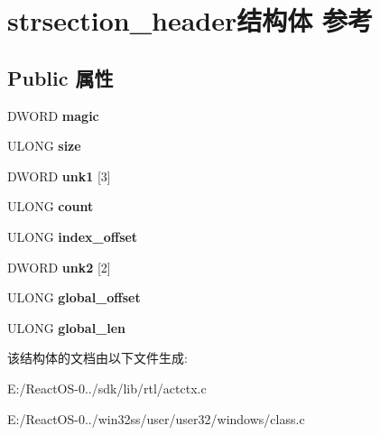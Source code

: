 \hypertarget{structstrsection__header}{}\section{strsection\+\_\+header结构体 参考}
\label{structstrsection__header}
\subsection*{Public 属性}
\begin{DoxyCompactItemize}
\item 
\mbox{\label{structstrsection__header_a0f4d5969d12c5f7605b0205c4ec34d9e}} 
D\+W\+O\+RD {\bfseries magic}
\item 
\mbox{\label{structstrsection__header_a67d764a321bee3d7b6ea0d385c965360}} 
U\+L\+O\+NG {\bfseries size}
\item 
\mbox{\label{structstrsection__header_a01d2f0e22b9e78d9903d50e5b0f43f2b}} 
D\+W\+O\+RD {\bfseries unk1} \mbox{[}3\mbox{]}
\item 
\mbox{\label{structstrsection__header_a1725d70d71948e3d7d85a242e8dd821a}} 
U\+L\+O\+NG {\bfseries count}
\item 
\mbox{\label{structstrsection__header_a0edddf017bfca6d4a8a8ae2c5a4ad5bb}} 
U\+L\+O\+NG {\bfseries index\+\_\+offset}
\item 
\mbox{\label{structstrsection__header_afcbe6866d78c55bb2ea39f9c1db5e1b0}} 
D\+W\+O\+RD {\bfseries unk2} \mbox{[}2\mbox{]}
\item 
\mbox{\label{structstrsection__header_a23edec944da5f7c13a7d2f38be4d2d26}} 
U\+L\+O\+NG {\bfseries global\+\_\+offset}
\item 
\mbox{\label{structstrsection__header_a426fdb7a9a9647b97c1d11d9de8c84b5}} 
U\+L\+O\+NG {\bfseries global\+\_\+len}
\end{DoxyCompactItemize}


该结构体的文档由以下文件生成\+:\begin{DoxyCompactItemize}
\item 
E\+:/\+React\+O\+S-\/0../sdk/lib/rtl/actctx.\+c\item 
E\+:/\+React\+O\+S-\/0../win32ss/user/user32/windows/class.\+c\end{DoxyCompactItemize}
